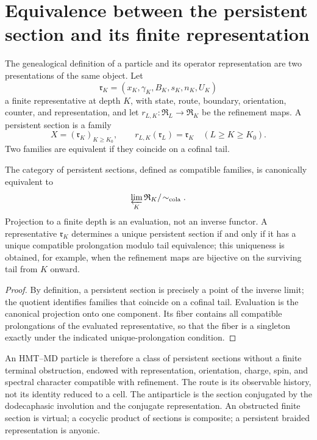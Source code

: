 \section{Equivalence between the persistent section and its finite representation}

The genealogical definition of a particle and its operator representation are
two presentations of the same object. Let
\[
 \mathfrak r_K=(x_K,\gamma_K,B_K,s_K,n_K,U_K)
\]
a finite representative at depth \(K\), with state, route, boundary,
orientation, counter, and representation, and let
\(r_{L,K}:\mathfrak R_L\to\mathfrak R_K\) be the refinement maps. A
persistent section is a family
\[
 X=(\mathfrak r_K)_{K\ge K_0},
 \qquad r_{L,K}(\mathfrak r_L)=\mathfrak r_K
 \quad(L\ge K\ge K_0).
\]
Two families are equivalent if they coincide on a cofinal tail.

\begin{theorem}
The category of persistent sections, defined as compatible families,
is canonically equivalent to
\[
 \varprojlim_K\mathfrak R_K/\!\sim_{\rm cola}.
\]
Projection to a finite depth is an evaluation, not an inverse functor. A representative \(\mathfrak r_K\) determines a unique persistent section if and only if it has a unique compatible prolongation modulo tail equivalence; this uniqueness is obtained, for example, when the refinement maps are bijective on the surviving tail from \(K\) onward.
\end{theorem}

\begin{proof}
By definition, a persistent section is precisely a point of the inverse
limit; the quotient identifies families that coincide on a cofinal tail.
Evaluation is the canonical projection onto one component. Its fiber contains
all compatible prolongations of the evaluated representative, so that the fiber
is a singleton exactly under the indicated unique-prolongation condition.
\end{proof}

An HMT--MD particle is therefore a class of persistent sections without a finite terminal obstruction, endowed with representation, orientation, charge, spin, and spectral character compatible with refinement. The route is its observable history, not its identity reduced to a cell. The antiparticle is the section conjugated by the dodecaphasic involution and the conjugate representation. An obstructed finite section is virtual; a cocyclic product of sections is composite; a persistent braided representation is anyonic.

